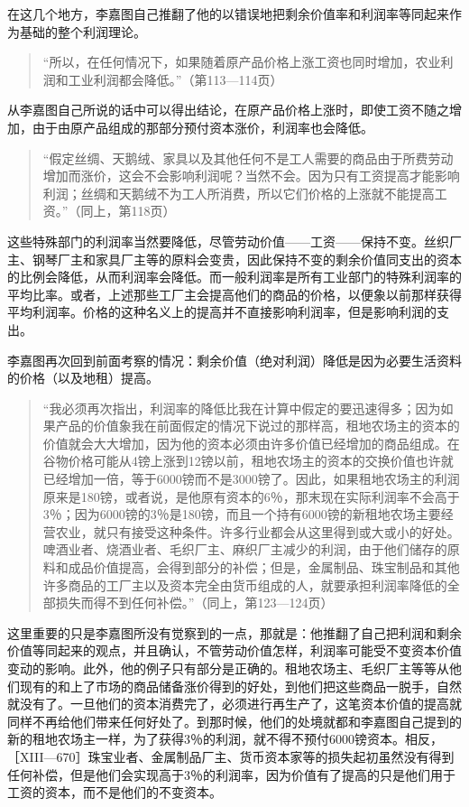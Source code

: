 在这几个地方，李嘉图自己推翻了他的以错误地把剩余价值率和利润率等同起来作为基础的整个利润理论。

\begin{quote}{“所以，在任何情况下，如果随着原产品价格上涨工资也同时增加，农业利润和工业利润都会降低。”（第113—114页）}\end{quote}

从李嘉图自己所说的话中可以得出结论，在原产品价格上涨时，即使工资不随之增加，由于由原产品组成的那部分预付资本涨价，利润率也会降低。

\begin{quote}{“假定丝绸、天鹅绒、家具以及其他任何不是工人需要的商品由于所费劳动增加而涨价，这会不会影响利润呢？当然不会。因为只有工资提高才能影响利润；丝绸和天鹅绒不为工人所消费，所以它们价格的上涨就不能提高工资。”（同上，第118页）}\end{quote}

这些特殊部门的利润率当然要降低，尽管劳动价值——工资——保持不变。丝织厂主、钢琴厂主和家具厂主等的原料会变贵，因此保持不变的剩余价值同支出的资本的比例会降低，从而利润率会降低。而一般利润率是所有工业部门的特殊利润率的平均比率。或者，上述那些工厂主会提高他们的商品的价格，以便象以前那样获得平均利润率。价格的这种名义上的提高并不直接影响利润率，但是影响利润的支出。

李嘉图再次回到前面考察的情况：剩余价值（绝对利润）降低是因为必要生活资料的价格（以及地租）提高。

\begin{quote}{“我必须再次指出，利润率的降低比我在计算中假定的要迅速得多；因为如果产品的价值象我在前面假定的情况下说过的那样高，租地农场主的资本的价值就会大大增加，因为他的资本必须由许多价值已经增加的商品组成。在谷物价格可能从4镑上涨到12镑以前，租地农场主的资本的交换价值也许就已经增加一倍，等于6000镑而不是3000镑了。因此，如果租地农场主的利润原来是180镑，或者说，是他原有资本的6％，那末现在实际利润率不会高于3％；因为6000镑的3％是180镑，而且一个持有6000镑的新租地农场主要经营农业，就只有接受这种条件。许多行业都会从这里得到或大或小的好处。啤酒业者、烧酒业者、毛织厂主、麻织厂主减少的利润，由于他们储存的原料和成品价值提高，会得到部分的补偿；但是，金属制品、珠宝制品和其他许多商品的工厂主以及资本完全由货币组成的人，就要承担利润率降低的全部损失而得不到任何补偿。”（同上，第123—124页）}\end{quote}

这里重要的只是李嘉图所没有觉察到的一点，那就是：他推翻了自己把利润和剩余价值等同起来的观点，并且确认，不管劳动价值怎样，利润率可能受不变资本价值变动的影响。此外，他的例子只有部分是正确的。租地农场主、毛织厂主等等从他们现有的和上了市场的商品储备涨价得到的好处，到他们把这些商品一脱手，自然就没有了。一旦他们的资本消费完了，必须进行再生产了，这笔资本价值的提高就同样不再给他们带来任何好处了。到那时候，他们的处境就都和李嘉图自己提到的新的租地农场主一样，为了获得3％的利润，就不得不预付6000镑资本。相反，［XIII—670］珠宝业者、金属制品厂主、货币资本家等的损失起初虽然没有得到任何补偿，但是他们会实现高于3％的利润率，因为价值有了提高的只是他们用于工资的资本，而不是他们的不变资本。

